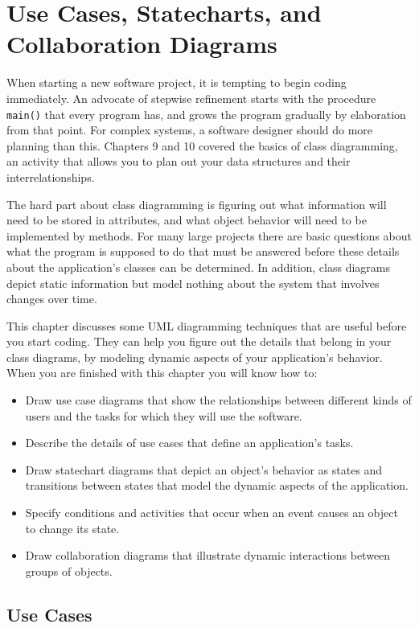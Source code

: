 \chapter{Use Cases, Statecharts, and Collaboration Diagrams}

When starting a new software project, it is tempting to begin coding
immediately. An advocate of stepwise refinement starts with the
procedure \texttt{main()} that every program has, and grows the program
gradually by elaboration from that point. For complex systems, a
software designer should do more planning than this. Chapters 9 and 10
covered the basics of class diagramming, an activity that allows you to
plan out your data structures and their interrelationships.

The hard part about class diagramming is figuring out what information
will need to be stored in attributes, and what object behavior will
need to be implemented by methods. For many large projects there are
basic questions about what the program is supposed to do that must be
answered before these details about the application's
classes can be determined. In addition, class diagrams depict static
information but model nothing about the system that involves changes
over time.

This chapter discusses some UML diagramming techniques that are useful
before you start coding. They can help you figure out the details that
belong in your class diagrams, by modeling dynamic aspects of your
application's behavior. When you are finished with
this chapter you will know how to:

\begin{itemize}
\item Draw use case diagrams that show the relationships between
      different kinds of users and the tasks for which they will use the
      software.
\item Describe the details of use cases that define an application's tasks.
\item Draw statechart diagrams that depict an object's behavior as states and
      transitions between states that model the dynamic aspects of the
      application.
\item Specify conditions and activities that occur when an event causes an
      object to change its state.
\item Draw collaboration diagrams that illustrate dynamic interactions between
      groups of objects.
\end{itemize}


\section{Use Cases}

